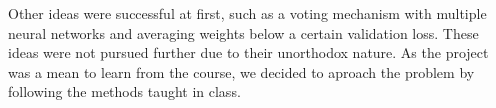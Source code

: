 \documentclass[11pt]{article}
\begin{document}
\begin{multicols}{2}
    Other ideas were successful at first, such as a voting mechanism with
    multiple neural networks and averaging weights below a certain validation
    loss. These ideas were not pursued further due to their unorthodox nature.
    As the project was a mean to learn from the course, we decided to aproach
    the problem by following the methods taught in class.





\end{multicols}
\end{document}
